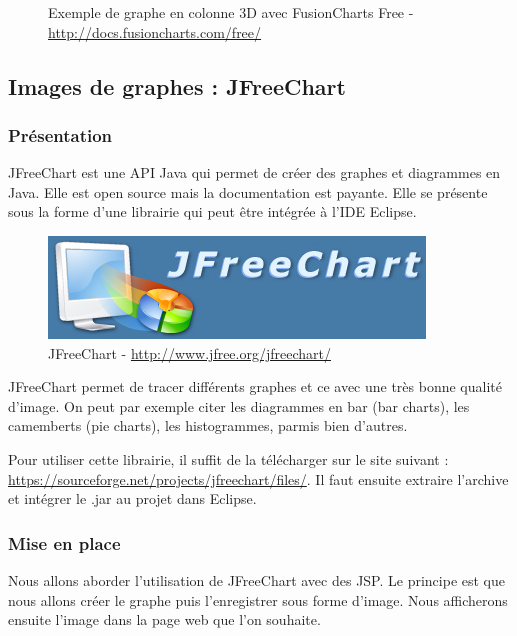 \begin{enumerate}
\begin{figure}[H]
  \caption{Exemple de graphe en colonne 3D avec FusionCharts Free - \url{http://docs.fusioncharts.com/free/}}
\end{figure}
\end{enumerate}


\subsection{Images de graphes : JFreeChart}
\subsubsection{Présentation}
JFreeChart est une API Java qui permet de créer des graphes et diagrammes en Java. Elle est open source mais la documentation est payante. Elle se présente sous la forme d'une librairie qui peut être intégrée à l'IDE Eclipse.
\begin{figure}[H]
  \center
  \includegraphics[scale=0.5]{../graph/JFreeChart.png}
  \caption{JFreeChart - \url{http://www.jfree.org/jfreechart/}}
\end{figure}

JFreeChart permet de tracer différents graphes et ce avec une très bonne qualité d'image. On peut par exemple citer les diagrammes en bar (bar charts), les camemberts (pie charts), les histogrammes, parmis bien d'autres.

Pour utiliser cette librairie, il suffit de la télécharger sur le site suivant : \url{https://sourceforge.net/projects/jfreechart/files/}.
Il faut ensuite extraire l'archive et intégrer le .jar au projet dans Eclipse.

\subsubsection{Mise en place}
Nous allons aborder l'utilisation de JFreeChart avec des JSP. Le principe est que nous allons créer le graphe puis l'enregistrer sous forme d'image. Nous afficherons ensuite l'image dans la page web que l'on souhaite.\\

